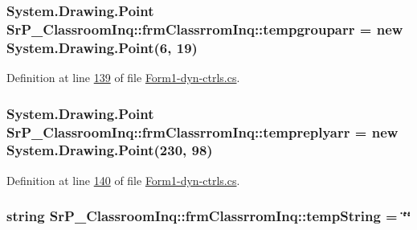 \hypertarget{class_sr_p___classroom_inq_1_1frm_classrrom_inq_a6c8231644b9d1f92d08f110b003d621e}{
\subsubsection[{tempgrouparr}]{\setlength{\rightskip}{0pt plus 5cm}\-System.\-Drawing.\-Point {\bf \-Sr\-P\-\_\-\-Classroom\-Inq\-::frm\-Classrrom\-Inq\-::tempgrouparr} = new \-System.\-Drawing.\-Point(6, 19)}}
\label{class_sr_p___classroom_inq_1_1frm_classrrom_inq_a6c8231644b9d1f92d08f110b003d621e}


\-Definition at line \hyperlink{_form1-dyn-ctrls_8cs_source_l00139}{139} of file \hyperlink{_form1-dyn-ctrls_8cs_source}{\-Form1-\/dyn-\/ctrls.\-cs}.

\hypertarget{class_sr_p___classroom_inq_1_1frm_classrrom_inq_ac6007ba00a6fab2fca4b74c0e588e850}{
\subsubsection[{tempreplyarr}]{\setlength{\rightskip}{0pt plus 5cm}\-System.\-Drawing.\-Point {\bf \-Sr\-P\-\_\-\-Classroom\-Inq\-::frm\-Classrrom\-Inq\-::tempreplyarr} = new \-System.\-Drawing.\-Point(230, 98)}}
\label{class_sr_p___classroom_inq_1_1frm_classrrom_inq_ac6007ba00a6fab2fca4b74c0e588e850}


\-Definition at line \hyperlink{_form1-dyn-ctrls_8cs_source_l00140}{140} of file \hyperlink{_form1-dyn-ctrls_8cs_source}{\-Form1-\/dyn-\/ctrls.\-cs}.

\hypertarget{class_sr_p___classroom_inq_1_1frm_classrrom_inq_aaad277eaea17731f132fb18aa3560a91}{
\subsubsection[{temp\-String}]{\setlength{\rightskip}{0pt plus 5cm}string {\bf \-Sr\-P\-\_\-\-Classroom\-Inq\-::frm\-Classrrom\-Inq\-::temp\-String} = \char`\"{}\char`\"{}}}
\label{class_sr_p___classroom_inq_1_1frm_classrrom_inq_aaad277eaea17731f132fb18aa3560a91}


